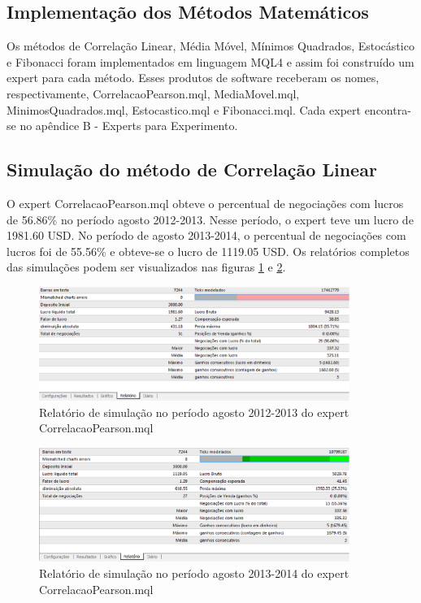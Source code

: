 \subsection{Implementação dos Métodos Matemáticos}

Os métodos de Correlação Linear, Média Móvel, Mínimos Quadrados, Estocástico e Fibonacci foram implementados em linguagem MQL4 e assim foi construído um expert para cada método. Esses produtos de software receberam os nomes, respectivamente, CorrelacaoPearson.mql, MediaMovel.mql, MinimosQuadrados.mql, Estocastico.mql e Fibonacci.mql. Cada expert encontra-se no apêndice B - Experts para Experimento.

\subsection{Simulação do método de Correlação Linear}

O expert CorrelacaoPearson.mql obteve o percentual de negociações com lucros de 56.86\% no período agosto 2012-2013. Nesse período, o expert teve um lucro de 1981.60 USD.
 No período de agosto 2013-2014, o percentual de negociações com lucros foi de 55.56\%  e obteve-se o lucro de 1119.05 USD. 
Os relatórios completos das simulações podem ser visualizados nas figuras \ref{protocoloCorrelacao} e \ref{protocoloCorrelacao2}.

\begin{figure}[H]
\centering
\includegraphics[width=0.9\textwidth]{figuras/protocoloCorrelacao}
\caption{Relatório de simulação no período agosto 2012-2013 do expert CorrelacaoPearson.mql}
\label{protocoloCorrelacao}
\end{figure}

\begin{figure}[H]
\centering

\includegraphics[width=0.9\textwidth]{figuras/protocoloCorrelacao2}
\caption{Relatório de simulação no período agosto 2013-2014 do expert CorrelacaoPearson.mql}
\label{protocoloCorrelacao2}
\end{figure}

